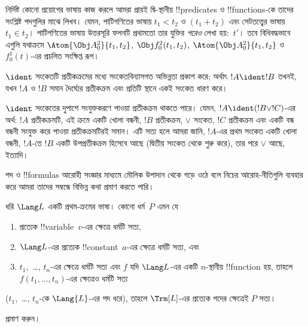 \documentclass[../../../include/open-logic-section]{subfiles}
\begin{document}
নির্দিষ্ট কোনো প্রয়োগের ভাষায় কাজ করলে আমরা প্রায়ই দ্বি-স্থানীয়
!!{predicate}s ও !!{function}s-কে তাদের সংশ্লিষ্ট পদগুলির মাঝে লিখব।
যেমন, পাটিগণিতের ভাষায় $t_1 < t_2$ ও $(t_1 + t_2)$ এবং সেটতত্ত্বের
ভাষায় $t_1 \in t_2$। পাটিগণিতের ভাষায় উত্তরসূরি ফলনটি প্রথামতো
তার যুক্তির \emph{পরেও} লেখা হয়:~$t'$। তবে বিধিবদ্ধভাবে এগুলি যথাক্রমে
$\Atom{\Obj A^2_0}{t_1, t_2}$, $\Obj f^2_0(t_1, t_2)$,
$\Atom{\Obj A^2_0}{t_1, t_2}$ ও $f^1_0(t)$-এর প্রচলিত সংক্ষিপ্ত রূপ।

\begin{defn}[সংকেতবিন্যাসগত অভিন্নতা]
$\ident$ সংকেতটি প্রতীকক্রমের মধ্যে সংকেতবিন্যাসগত অভিন্নতা প্রকাশ করে;
অর্থাৎ $!A \ident !B$ তখনই, যখন $!A$ ও $!B$ সমান দৈর্ঘ্যের প্রতীকক্রম
এবং প্রতিটি স্থানে একই সংকেত ধারণ করে।
\end{defn}

$\ident$ সংকেতের দুপাশে সংযুক্তকরণে পাওয়া প্রতীকক্রম থাকতে পারে। যেমন,
$!A \ident (!B \lor !C)$-এর অর্থ: $!A$ প্রতীকক্রমটি, এই ক্রমে একটি
খোলা বন্ধনী, $!B$ প্রতীকক্রম, $\lor$ সংকেত, $!C$ প্রতীকক্রম এবং একটি
বন্ধ বন্ধনী সংযুক্ত করে পাওয়া প্রতীকক্রমটিরই সমান। এটি সত্য হলে আমরা
জানি, $!A$-এর প্রথম সংকেত একটি খোলা বন্ধনী, $!A$-তে $!B$ একটি
উপপ্রতীকক্রম হিসেবে আছে (দ্বিতীয় সংকেত থেকে শুরু করে), তার পরে
$\lor$ আছে, ইত্যাদি।

পদ ও !!{formula}s আরোহী সংজ্ঞার মাধ্যমে মৌলিক উপাদান থেকে গড়ে ওঠে বলে
নিচের আরোহ-নীতিগুলি ব্যবহার করে আমরা তাদের সম্বন্ধে বিভিন্ন কথা প্রমাণ
করতে পারি।

\begin{lem}
    ধরি $\Lang L$ একটি প্রথম-ক্রমের ভাষা।
    কোনো ধর্ম~$P$ এমন যে
    \begin{enumerate}
        \item প্রত্যেক !!{variable}~$v$-এর ক্ষেত্রে ধর্মটি সত্য,
        \item $\Lang L$-এর প্রত্যেক !!{constant}~$a$-এর ক্ষেত্রে ধর্মটি
        সত্য, এবং
        \item $t_1$,~\dots, $t_n$-এর ক্ষেত্রে ধর্মটি সত্য এবং $f$ যদি
        $\Lang L$-এর একটি $n$-স্থানীয় !!{function} হয়, তাহলে
        $f(t_1,\dotsc,t_n)$-এর ক্ষেত্রেও ধর্মটি সত্য
    \end{enumerate}
    ($t_1$,~\dots, $t_n$-কে $\Lang{L}$-এর পদ ধরে),
    তাহলে $\Trm[L]$-এর প্রত্যেক পদের ক্ষেত্রেই $P$ সত্য।
\end{lem}

\begin{prob}
     প্রমাণ করুন।
\end{prob}
\end{document}
